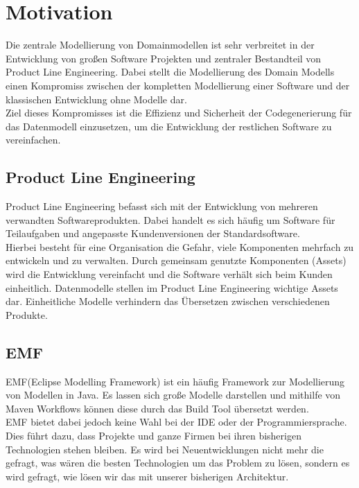 \documentclass[./einleitung.tex]{subfiles}
\begin{document}
\section{Motivation}
Die zentrale Modellierung von Domainmodellen ist sehr verbreitet in der Entwicklung von großen Software Projekten und zentraler Bestandteil von Product Line Engineering. Dabei stellt die Modellierung des Domain Modells einen Kompromiss zwischen der kompletten Modellierung einer Software und der klassischen Entwicklung ohne Modelle dar. \\
Ziel dieses Kompromisses ist die Effizienz und Sicherheit der Codegenerierung für das Datenmodell einzusetzen, um die Entwicklung der restlichen Software zu vereinfachen.

\subsection{Product Line Engineering}
Product Line Engineering befasst sich mit der Entwicklung von mehreren verwandten Softwareprodukten. Dabei handelt es sich häufig um Software für Teilaufgaben und angepasste Kundenversionen der Standardsoftware. \\
Hierbei besteht für eine Organisation die Gefahr, viele Komponenten mehrfach zu entwickeln und zu verwalten. Durch gemeinsam genutzte Komponenten (Assets) wird die Entwicklung vereinfacht und die Software verhält sich beim Kunden einheitlich. Datenmodelle stellen im Product Line Engineering wichtige Assets dar. Einheitliche Modelle verhindern das Übersetzen zwischen verschiedenen Produkte.

\subsection{EMF}
EMF(Eclipse Modelling Framework) ist ein häufig Framework zur Modellierung von Modellen in Java. Es lassen sich große Modelle darstellen und mithilfe von Maven Workflows können diese durch das Build Tool übersetzt werden. \\
EMF bietet dabei jedoch keine Wahl bei der IDE oder der Programmiersprache.
Dies führt dazu, dass Projekte und ganze Firmen bei ihren bisherigen Technologien stehen bleiben. Es wird bei Neuentwicklungen nicht mehr die gefragt, was wären die besten Technologien um das Problem zu lösen, sondern es wird gefragt, wie lösen wir das mit unserer bisherigen Architektur. 
\end{document}
